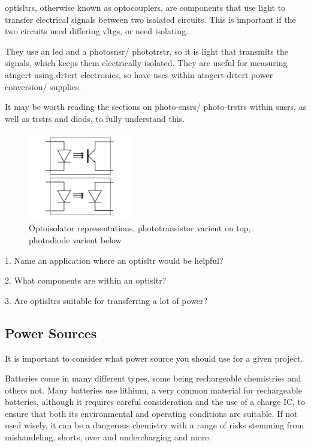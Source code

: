 \documentclass[a4paper,11pt]{report}
\newcommand{\Quiz}[1] %
{
\par\noindent %
\phantomsection %
\todo[inline, color=blue!30]{\textbf{#1}} %
\vspace{1em} %
}
\begin{document}
\gls{optisltr}s, otherwise known as optocouplers, are components that use light to transfer electrical signals between two isolated circuits. This is important if the two circuits need differing \gls{vltg}s, or need isolating.

They use an \gls{led} and a photo\gls{snsr}/ photo\gls{trstr}, so it is light that transmits the signals, which keeps them electrically isolated. They are useful for measuring \gls{atngcrt} using \gls{drtcrt} electronics, so have uses within \gls{atngcrt}-\gls{drtcrt} power conversion/ supplies.

It may be worth reading the sections on photo-\gls{snsr}s/ photo-\gls{trstr}s within \gls{snsr}s, as well as \gls{trstr}s and \gls{diod}s, to fully understand this.

\begin{figure}[H]
\centering
\includegraphics[width=0.4\textwidth]{optoisolator1}
\caption{Optoisolator representations, phototransistor varient on top, photodiode varient below}
\end{figure}

\Quiz{Quiz}

1. Name an application where an \gls{optisltr} would be helpful?

2. What components are within an \gls{optisltr}?

3. Are \gls{optisltr}s suitable for transferring a lot of power?

\vspace*{1\baselineskip}

\subsection{Power Sources}

It is important to consider what power source you should use for a given project.

Batteries come in many different types, some being rechargeable chemistries and others not. Many batteries use lithium, a very common material for rechargeable batteries, although it requires careful consideration and the use of a charge IC, to ensure that both its environmental and operating conditions are suitable. If not used wisely, it can be a dangerous chemistry with a range of risks stemming from mishandeling, shorts, over and undercharging and more.
\end{document}
